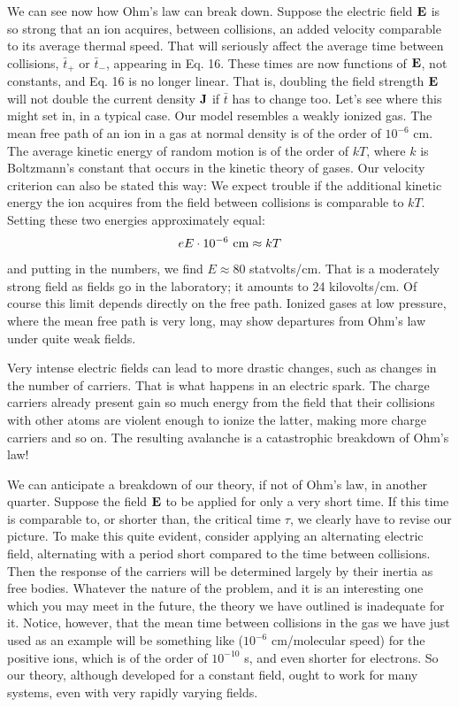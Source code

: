 We can see now how Ohm's law can break down. Suppose the
electric field $\mathbf{E}$ is so strong that an ion acquires, between collisions,
an added velocity comparable to its average thermal speed. That
will seriously affect the average time between collisions, $\bar{t}_+$ or $\bar{t}_-$,
appearing in Eq. 16. These times are now functions of $\mathbf{E}$, not constants,
and Eq. 16 is no longer linear. That is, doubling the field
strength $\mathbf{E}$ will not double the current density $\mathbf{J}$ if $\bar{t}$ has to change too.
Let's see where this might set in, in a typical case. Our model
resembles a weakly ionized gas. The mean free path of an ion in a
gas at normal density is of the order of $10^{-6}$ cm. The average kinetic
energy of random motion is of the order of $kT$, where $k$ is Boltzmann's
constant that occurs in the kinetic theory of gases. Our velocity
criterion can also be stated this way: We expect trouble if the additional
kinetic energy the ion acquires from the field between collisions
is comparable to $kT$. Setting these two energies approximately
equal:
\begin{equation}
  eE\cdot10^{-6}\ \textup{cm} \approx kT
\end{equation}
and putting in the numbers, we find $E\approx 80$ statvolts/cm. That is
a moderately strong field as fields go in the laboratory; it amounts
to 24 kilovolts/cm. Of course this limit depends directly on the free
path. Ionized gases at low pressure, where the mean free path is very
long, may show departures from Ohm's law under quite weak fields.

Very intense electric fields can lead to more drastic changes, such
as changes in the number of carriers. That is what happens in an
electric spark. The charge carriers already present gain so much
energy from the field that their collisions with other atoms are violent
enough to ionize the latter, making more charge carriers and so on.
The resulting avalanche is a catastrophic breakdown of Ohm's law!

We can anticipate a breakdown of our theory, if not of Ohm's law,
in another quarter. Suppose the field $\mathbf{E}$ to be applied for only a very
short time. If this time is comparable to, or shorter than, the critical
time $\tau$, we clearly have to revise our picture. To make this quite
evident, consider applying an alternating electric field, alternating
with a period short compared to the time between collisions. Then
the response of the carriers will be determined largely by their inertia
as free bodies. Whatever the nature of the problem, and it is an interesting
one which you may meet in the future, the theory we have
outlined is inadequate for it. Notice, however, that the mean time
between collisions in the gas we have just used as an example will be
something like ($10^{-6}$ cm/molecular speed) for the positive ions,
which is of the order of $10^{-10}$ s, and even shorter for electrons. So
our theory, although developed for a constant field, ought to work
for many systems, even with very rapidly varying fields.

